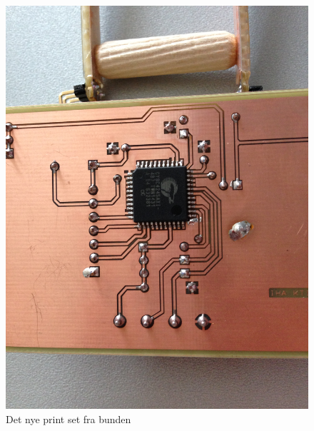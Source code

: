 \begin{figure}[H]
	\centering 
\includegraphics[scale=0.08]{HardwareArkitektur/Sensore/Jordfugt_billeder/print_ny_bund.JPG}
	\caption{Det nye print set fra bunden}
	\label{photo:print_ny_bund}
\end{figure} 

